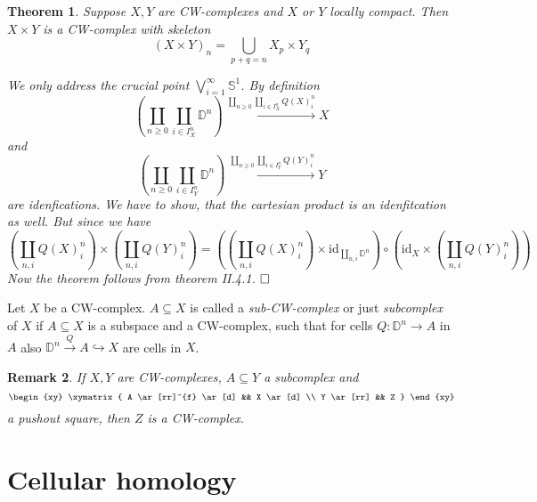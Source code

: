 \documentclass[11pt]{book}
\numberwithin{dummy}{section}
\newtheorem{theorem}{Theorem}[section]
\newtheorem{remark}[theorem]{Remark}
\theoremstyle{nonumberbreak}
\newenvironment{defin}[1][]{\ifthenelse{\equal{#1}{}}{\definition}{\definition[#1]}\rm}{\enddefinition}
\newenvironment{pr}[1][]{\ifthenelse{\equal{#1}{}}{\proof}{\proof[#1]}\rm}{\endproof}
\newcommand{\la}{\longrightarrow}
\newcommand{\id}{\mathrm{id}}
\begin{document}
\begin{spacing}{1.4}
\begin{theorem}
Suppose $X,Y$ are CW-complexes and $X$ or $Y$ locally compact. Then $X \times Y$ is a CW-complex with skeleton
$$(X \times Y)_n= \bigcup_{p+q=n} X_p \times Y_q$$

\begin{pr}
We only address the crucial point $\bigvee_{i=1}^{\infty} \mathbb{S}^1$. By definition
$$\left( \coprod_{n\geqslant 0} \coprod_{i \in I_X^n} \mathbb{D}^n\right) \xrightarrow{ \amalg_{n \geqslant 0} \amalg_{i \in  I_X^n} Q(X)_i^n} X$$
and 
$$\left( \coprod_{n\geqslant 0} \coprod_{i \in I_Y^n} \mathbb{D}^n\right) \xrightarrow{ \amalg_{n \geqslant 0} \amalg_{i\in  I_Y^n} Q(Y)_i^n} Y$$
are idenfications. We have to show, that the cartesian product is an idenfitcation as well. But since we have
$$\left( \coprod_{n,i} Q(X)_i^n \right) \times \left( \coprod_{n,i} Q(Y)_i^n \right) = \left( \left( \coprod_{n,i} Q(X)_i^n\right) \times \id_{\coprod_{n,i} \mathbb{D}^n} \right) \circ \left( \id_X \times \left( \coprod_{n,i} Q(Y)_i^n\right) \right)$$
Now the theorem follows from theorem II.4.1. $\hfill \Box$




\end{pr}


\end{theorem}


\begin{defin}
Let $X$ be a CW-complex. $A\subseteq X$ is called a \textit{sub-CW-complex} or just \textit{subcomplex} of $X$ if $A \subseteq X$ is a subspace and a CW-complex, such that for cells $Q: \mathbb{D}^n \la A$ in $A$ also $\mathbb{D}^n \overset{Q}{\la} A \hookrightarrow X$ are cells in $X$.
\end{defin}


\begin{remark}
If $X,Y$ are CW-complexes, $A \subseteq Y$ a subcomplex and
$$
\begin{xy}
\xymatrix{
A \ar[rr]^{f} \ar[d] && X \ar[d] \\ Y \ar[rr] && Z
}
\end{xy}
$$
a pushout square, then $Z$ is a CW-complex.
\end{remark}










\section{Cellular homology} %





\end{spacing}
\end{document}
